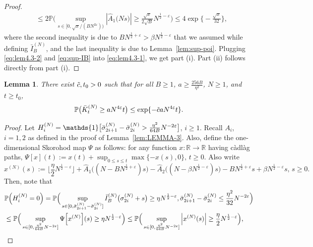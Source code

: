 \documentclass[11pt, reqno]{article}
\newtheorem{lemma}[theorem]{Lemma}
\numberwithin{equation}{section}
\numberwithin{theorem}{section}
\newcommand{\R}{\mathbb{R}}                 %
\begin{document}
\begin{appendix}
\begin{proof}
\begin{equation}
\begin{split}
     & \leq 2\mathbb{P}\big(\sup_{s\in[0,\sqrt{x}/(BN^{2\varepsilon}))} |\hat{A}_1\big(Ns\big)| \geq \frac{\sqrt{x}}{2\sqrt{B}}N^{\frac{1}{2}-\varepsilon}\big)
    \leq  4\exp \big\{-\frac{\sqrt{x}}{32}\big\},
\end{split}
\end{equation}
where the second inequality is due to $BN^{\frac{1}{2}+\varepsilon}>\beta N^{\frac{1}{2}-\varepsilon}$ that we assumed while defining $\bar{I}^{(N)}_B$, and the last inequality is due to Lemma~\ref{lem:sup-poi}.
Plugging \eqref{eq:lem4.3-2} and \eqref{eq:sup-IB} into \eqref{eq:lem4.3-1}, we get part (i). 
Part (ii) follows directly from part (i).
\end{proof}

\begin{lemma}\label{lem:LEMMA-4}
There exist $ \Tilde{c}, t_0>0$ such that for all $B \ge 1$, $a\geq \frac{256B}{\eta^2}$,  $ N\geq 1$, and $t\geq t_0$,
$$\mathbb{P}\big(\bar{K}^{(N)}_t\geq aN^{4\varepsilon}t\big)\leq \exp \{-\Tilde{c}aN^{4\varepsilon}t\}.$$
\end{lemma}
\begin{proof}%
Let $H^{(N)}_i=\mathds{1}\big[\Bar{\sigma}^{(N)}_{2i+1}-\Bar{\sigma}^{(N)}_{2i}>\frac{\eta^2}{64B}N^{-2\varepsilon}\big]$, $i\geq 1$. 
Recall $A_i$, $i=1,2$ as defined in the proof of Lemma~\ref{lem:LEMMA-3}. Also, define the one-dimensional Skorohod map $\Psi$ as follows: for any function $x:\R \to \R$ having c\`adl\`ag paths, $\Psi[x](t) := x(t) + \sup_{0\leq s\leq t} \max\{-x(s), 0\}, \, t \ge 0.$ 
Also write
$$
x^{(N)}(s) := \lfloor\frac{\eta}{2}N^{\frac{1}{2}-\varepsilon}\rfloor +\hat{A}_1\big((N-BN^{\frac{1}{2}+\varepsilon})s\big)-\hat{A}_2\big((N-\beta N^{\frac{1}{2}-\varepsilon})s\big)-BN^{\frac{1}{2}+\varepsilon}s+\beta N^{\frac{1}{2}-\varepsilon}s, \, s \ge 0.
$$
Then, note that
\begin{align}\label{en1}
    &\mathbb{P}\Big(H^{(N)}_i=0\Big)\notag=\mathbb{P}\Big(\sup_{s\in [0,\Bar{\sigma}^{(N)}_{2i+1}-\Bar{\sigma}^{(N)}_{2i}]}\Bar{I}_B^{(N)}\big(\sigma^{(N)}_{2i}+s\big)\geq \eta N^{\frac{1}{2}-\varepsilon}, \Bar{\sigma}^{(N)}_{2i+1}-\Bar{\sigma}^{(N)}_{2i}\leq \frac{\eta^2}{32}N^{-2\varepsilon}\Big)\notag\\
    &\leq \mathbb{P}\Big(\sup_{s\in [0,\frac{\eta^2}{64B}N^{-2\varepsilon}]}\Psi\Big[x^{(N)}\Big](s) \geq \eta N^{\frac{1}{2}-\varepsilon}\Big)
    \le \mathbb{P}\Big(\sup_{s\in [0,\frac{\eta^2}{64B}N^{-2\varepsilon}]}\Big|x^{(N)}(s)\Big| \geq \frac{\eta}{2} N^{\frac{1}{2}-\varepsilon}\Big),

\end{align}
\end{proof}
\end{appendix}
\end{document}
